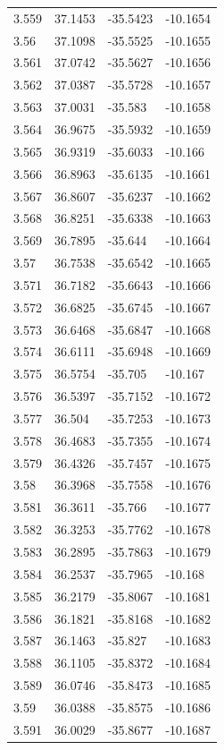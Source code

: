 \begin{tabular}{llll}
3.559 & 37.1453 & -35.5423 & -10.1654 \\
3.56 & 37.1098 & -35.5525 & -10.1655 \\
3.561 & 37.0742 & -35.5627 & -10.1656 \\
3.562 & 37.0387 & -35.5728 & -10.1657 \\
3.563 & 37.0031 & -35.583 & -10.1658 \\
3.564 & 36.9675 & -35.5932 & -10.1659 \\
3.565 & 36.9319 & -35.6033 & -10.166 \\
3.566 & 36.8963 & -35.6135 & -10.1661 \\
3.567 & 36.8607 & -35.6237 & -10.1662 \\
3.568 & 36.8251 & -35.6338 & -10.1663 \\
3.569 & 36.7895 & -35.644 & -10.1664 \\
3.57 & 36.7538 & -35.6542 & -10.1665 \\
3.571 & 36.7182 & -35.6643 & -10.1666 \\
3.572 & 36.6825 & -35.6745 & -10.1667 \\
3.573 & 36.6468 & -35.6847 & -10.1668 \\
3.574 & 36.6111 & -35.6948 & -10.1669 \\
3.575 & 36.5754 & -35.705 & -10.167 \\
3.576 & 36.5397 & -35.7152 & -10.1672 \\
3.577 & 36.504 & -35.7253 & -10.1673 \\
3.578 & 36.4683 & -35.7355 & -10.1674 \\
3.579 & 36.4326 & -35.7457 & -10.1675 \\
3.58 & 36.3968 & -35.7558 & -10.1676 \\
3.581 & 36.3611 & -35.766 & -10.1677 \\
3.582 & 36.3253 & -35.7762 & -10.1678 \\
3.583 & 36.2895 & -35.7863 & -10.1679 \\
3.584 & 36.2537 & -35.7965 & -10.168 \\
3.585 & 36.2179 & -35.8067 & -10.1681 \\
3.586 & 36.1821 & -35.8168 & -10.1682 \\
3.587 & 36.1463 & -35.827 & -10.1683 \\
3.588 & 36.1105 & -35.8372 & -10.1684 \\
3.589 & 36.0746 & -35.8473 & -10.1685 \\
3.59 & 36.0388 & -35.8575 & -10.1686 \\
3.591 & 36.0029 & -35.8677 & -10.1687 \\

\end{tabular}
